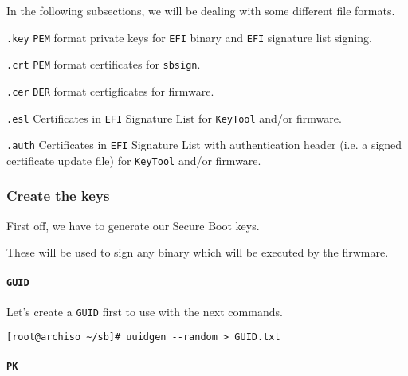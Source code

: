 \documentclass[10pt]{dustdoc}
\begin{document}
In the following subsections, we will be dealing with some different file formats.

\begin{sidebar}{\texttt{.key}}
    \texttt{PEM} format private keys for \texttt{EFI} binary and \texttt{EFI} signature list signing.
\end{sidebar}

\begin{sidebar}{\texttt{.crt}}
    \texttt{PEM} format certificates for \texttt{sbsign}.
\end{sidebar}

\begin{sidebar}{\texttt{.cer}}
    \texttt{DER} format certigficates for firmware.
\end{sidebar}

\begin{sidebar}{\texttt{.esl}}
    Certificates in \texttt{EFI} Signature List for \texttt{KeyTool} and/or firmware.
\end{sidebar}

\begin{sidebar}{\texttt{.auth}}
    Certificates in \texttt{EFI} Signature List with authentication header (i.e. a signed certificate update file) for \texttt{KeyTool} and/or firmware.
\end{sidebar}

\subsubsection{Create the keys}
\label{sec:create-the-keys}

First off, we have to generate our Secure Boot keys.

These will be used to sign any binary which will be executed by the firwmare.

\paragraph{\texttt{GUID}}
\label{par:guid}

Let’s create a \texttt{GUID} first to use with the next commands.

\begin{verbatim}
[root@archiso ~/sb]# uuidgen --random > GUID.txt
\end{verbatim}

\paragraph{\texttt{PK}}
\label{par:pk}
\end{document}
